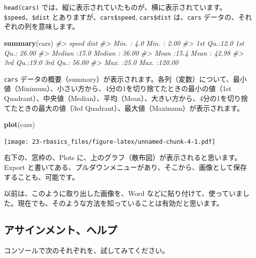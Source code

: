 \documentclass[
  xelatex, ja=standard]{bxjsbook}
\newenvironment{Shaded}{\begin{snugshade}}{\end{snugshade}}
\newcommand{\CommentTok}[1]{\textcolor[rgb]{0.56,0.35,0.01}{\textit{#1}}}
\newcommand{\FunctionTok}[1]{\textcolor[rgb]{0.13,0.29,0.53}{\textbf{#1}}}
\newcommand{\NormalTok}[1]{#1}
\theoremstyle{definition}
\theoremstyle{definition}
\theoremstyle{definition}
\theoremstyle{definition}
\theoremstyle{remark}
\begin{document}
\texttt{head(cars)} では、縦に表示されていたものが、横に表示されています。\texttt{\$speed}、\texttt{\$dist} とありますが、\texttt{cars\$speed}, \texttt{cars\$dist} は、\texttt{cars} データの、それぞれの列を意味します。

\begin{Shaded}
\begin{Highlighting}[]
\FunctionTok{summary}\NormalTok{(cars)}
\CommentTok{\#\textgreater{}      speed           dist       }
\CommentTok{\#\textgreater{}  Min.   : 4.0   Min.   :  2.00  }
\CommentTok{\#\textgreater{}  1st Qu.:12.0   1st Qu.: 26.00  }
\CommentTok{\#\textgreater{}  Median :15.0   Median : 36.00  }
\CommentTok{\#\textgreater{}  Mean   :15.4   Mean   : 42.98  }
\CommentTok{\#\textgreater{}  3rd Qu.:19.0   3rd Qu.: 56.00  }
\CommentTok{\#\textgreater{}  Max.   :25.0   Max.   :120.00}
\end{Highlighting}
\end{Shaded}

\texttt{cars} データの概要（summary）が表示されます。各列（変数）について、最小値（Minimum）、小さい方から、4分の1を切り捨てたときの最小の値（1st Quadrant）、中央値（Median）、平均（Mean）、大きい方から、4分の1を切り捨てたときの最大の値（3rd Quadrant）、最大値（Maximum）が表示されます。

\begin{Shaded}
\begin{Highlighting}[]
\FunctionTok{plot}\NormalTok{(cars)}
\end{Highlighting}
\end{Shaded}

\texttt{[image: 23-rbasics\_files/figure-latex/unnamed-chunk-4-1.pdf]}

右下の、窓枠の、Plots に、上のグラフ（散布図）が表示されると思います。Export と書いてある、プルダウンメニューがあり、そこから、画像として保存することも、可能です。

以前は、このように取り出した画像を、Word などに貼り付けて、使っていました。現在でも、そのような方法を知っていることは有効だと思います。

\hypertarget{ux30a2ux30b5ux30a4ux30f3ux30e1ux30f3ux30c8ux30d8ux30ebux30d7}{%
\subsection{アサインメント、ヘルプ}\label{ux30a2ux30b5ux30a4ux30f3ux30e1ux30f3ux30c8ux30d8ux30ebux30d7}}

コンソールで次のそれぞれを、試してみてください。
\end{document}
